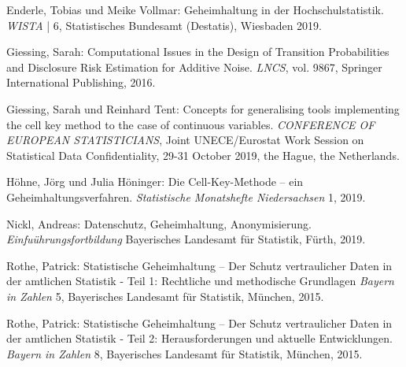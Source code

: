 

\begin{thebibliography}{9}
\singlespacing%

Enderle, Tobias und Meike Vollmar: Geheimhaltung in der Hochschulstatistik. \emph{WISTA} | 6, Statistisches Bundesamt (Destatis), Wiesbaden 2019.

Giessing, Sarah: Computational Issues in the Design of Transition Probabilities and Disclosure Risk Estimation for Additive Noise.
\emph{LNCS}, vol. 9867, Springer International Publishing, 2016.

Giessing, Sarah und Reinhard Tent: Concepts for generalising tools implementing the cell key method to the case of continuous variables.
\emph{CONFERENCE OF EUROPEAN STATISTICIANS}, Joint UNECE/Eurostat Work Session on Statistical Data Confidentiality, 29-31 October 2019, the Hague, the Netherlands.

Höhne, Jörg und Julia Höninger: Die Cell-Key-Methode – ein Geheimhaltungsverfahren. \emph{Statistische Monatshefte Niedersachsen} 1, 2019.

Nickl, Andreas: Datenschutz, Geheimhaltung, Anonymisierung. \emph{Einfuührungsfortbildung} Bayerisches Landesamt für Statistik, Fürth, 2019.

Rothe, Patrick: Statistische Geheimhaltung – Der Schutz vertraulicher Daten in der amtlichen Statistik - Teil 1: Rechtliche und methodische Grundlagen \emph{Bayern in Zahlen} 5, Bayerisches Landesamt für Statistik, München, 2015.

Rothe, Patrick: Statistische Geheimhaltung – Der Schutz vertraulicher Daten in der amtlichen Statistik - Teil 2: Herausforderungen und aktuelle Entwicklungen. \emph{Bayern in Zahlen} 8, Bayerisches Landesamt für Statistik, München, 2015.


\end{thebibliography}
